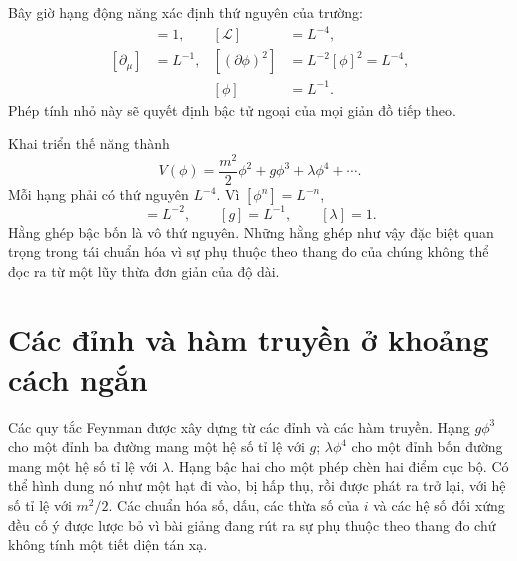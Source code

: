 \begin{classroomqa}
\end{classroomqa}

Bây giờ hạng động năng xác định thứ nguyên của trường:
\begin{align}
[S]&=1, & [\mathcal L]&=L^{-4},\\
[\partial_\mu]&=L^{-1}, &
[(\partial\phi)^2]&=L^{-2}[\phi]^2=L^{-4},\nonumber\\
&& [\phi]&=L^{-1}.
\label{eq:scalar-dimension}
\end{align}
Phép tính nhỏ này sẽ quyết định bậc tử ngoại của mọi giản đồ tiếp theo.

Khai triển thế năng thành
\begin{equation}
V(\phi)=\frac{m^2}{2}\phi^2+g\phi^3+\lambda\phi^4+\cdots.
\label{eq:scalar-potential}
\end{equation}
Mỗi hạng phải có thứ nguyên \(L^{-4}\). Vì \([\phi^n]=L^{-n}\),
\begin{equation}
[m^2]=L^{-2},
\qquad
[g]=L^{-1},
\qquad
[\lambda]=1.
\label{eq:coupling-dimensions}
\end{equation}
Hằng ghép bậc bốn là vô thứ nguyên. Những hằng ghép như vậy đặc biệt quan trọng trong tái chuẩn hóa vì sự phụ thuộc theo thang đo của chúng không thể đọc ra từ một lũy thừa đơn giản của độ dài.

\begin{classroomqa}
\end{classroomqa}

\section{Các đỉnh và hàm truyền ở khoảng cách ngắn}

Các quy tắc Feynman được xây dựng từ các đỉnh và các hàm truyền. Hạng \(g\phi^3\) cho một đỉnh ba đường mang một hệ số tỉ lệ với \(g\); \(\lambda\phi^4\) cho một đỉnh bốn đường mang một hệ số tỉ lệ với \(\lambda\). Hạng bậc hai cho một phép chèn hai điểm cục bộ. Có thể hình dung nó như một hạt đi vào, bị hấp thụ, rồi được phát ra trở lại, với hệ số tỉ lệ với \(m^2/2\). Các chuẩn hóa số, dấu, các thừa số của \(i\) và các hệ số đối xứng đều cố ý được lược bỏ vì bài giảng đang rút ra sự phụ thuộc theo thang đo chứ không tính một tiết diện tán xạ.

